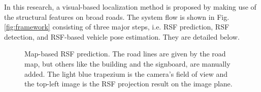 \documentclass[letterpaper, 10 pt, conference]{ieeeconf}  %
\begin{document}
In this research, a visual-based localization method is proposed by making use of the structural features on broad roads. The system flow is shown in Fig. \ref{fig:framework} consisting of three major steps, i.e. RSF prediction, RSF detection, and RSF-based vehicle pose estimation. They are detailed below.

\begin{figure}
  \centering
  \caption{Map-based RSF prediction. The road lines are given by the road map, but others like the building and the signboard, are manually added. The light blue trapezium is the camera's field of view and the top-left image is the RSF projection result on the image plane.}
  \label{fig:map_based_prediction}
\end{figure}
\end{document}
